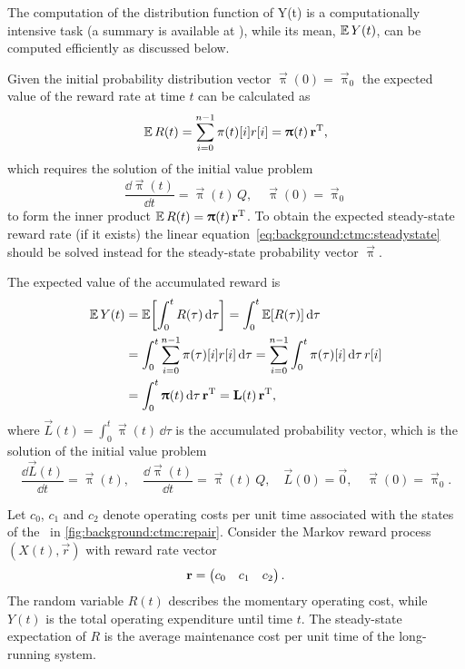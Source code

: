 The computation of the distribution function of Y(t) is a
computationally intensive task (a summary is available at \citep[Table
1]{RACZ02h}), while its mean, $\Ex Y(t)$, can be computed
efficiently as discussed below.

Given the initial probability distribution vector
$\vec{\uppi}(0) = \vec{\uppi}_0$ the expected value of the reward rate
at time $t$ can be calculated as
\begin{equation}
  \label{eq:background:ctmc:reward}
  \Ex R(t) = \sum_{i = 0}^{n - 1} \pi(t)[i] r[i] = \vec{\uppi}(t)
  \, \vec{r}^\T \text,
\end{equation}
which requires the solution of the initial value problem%
~\citep{DBLP:journals/cor/Grassmann77,reibman1989markov}
\begin{equation}
  \frac{\dd \vec{\uppi}(t)}{\dd t} = \vec{\uppi}(t) \, Q, \quad
  \vec{\uppi}(0) = \vec{\uppi}_0
\end{equation}
to form the inner product $\Ex R(t) = \vec{\uppi}(t) \, \vec{r}^\T$.
To obtain the expected steady-state reward rate (if it exists) the
linear equation~\eqref{eq:background:ctmc:steadystate} should be
solved instead for the steady-state probability vector $\vec{\uppi}$.

The expected value of the accumulated reward is
\begin{align}
  \Ex Y(t) &= \Ex\mleft[ \int_0^t R(\tau) \,\dd\tau \mright] =
             \int_0^t \Ex[R(\tau)] \,\dd\tau \\
           &= \int_0^t \sum_{i = 0}^{n - 1} \pi(\tau)[i] r[i]
             \,\dd\tau = \sum_{i = 0}^{n - 1} \int_0^t \pi(\tau)[i]
             \,\dd\tau \, r[i] \\
           &= \int_0^t \vec{\uppi}(t) \,\dd\tau \, \vec{r}^\T =
             \vec{L}(t) \, \vec{r}^\T \text,
\end{align}
where $\vec{L}(t) = \int_0^t \vec{\uppi}(t) \,\dd\tau$ is the accumulated
probability vector, which is the solution of the initial value
problem~\citep{reibman1989markov}
\begin{equation}
  \label{eq:background:ctmc:L-ivp}
  \frac{\dd \vec{L}(t)}{\dd t} = \vec{\uppi}(t), \quad \frac{\dd
    \vec{\uppi}(t)}{\dd t} = \vec{\uppi}(t) \, Q, \quad
  \vec{L}(0) = \vec{0}, \quad \vec{\uppi}(0) = \vec{\uppi}_0.
\end{equation}

\begin{example}
  Let $c_0$, $c_1$ and $c_2$ denote operating costs per unit time
  associated with the states of the \CTMC\ in
  \cref{fig:background:ctmc:repair}. Consider the Markov reward
  process $(X(t), \vec{r})$ with reward rate vector
  \begin{equation}
    \vec{r} = \begin{pmatrix} c_0 & c_1 & c_2 \end{pmatrix} \text.
  \end{equation}
  The random variable $R(t)$ describes the momentary operating cost,
  while $Y(t)$ is the total operating expenditure until time $t$. The
  steady-state expectation of $R$ is the average maintenance cost per
  unit time of the long-running system.
\end{example}


